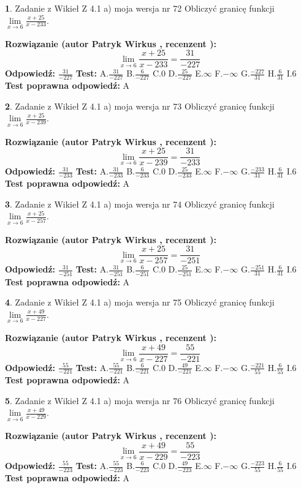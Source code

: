 \documentclass[12pt, a4paper]{article}
\theoremstyle{definition} %
\newtheorem{zad}{}
\newcommand{\zadStart}[1]{\begin{zad}#1\newline}
\newcommand{\zadStop}{\end{zad}}
\newcommand{\rozwStart}[2]{\noindent \textbf{Rozwiązanie (autor #1 , recenzent #2): }\newline}
\newcommand{\rozwStop}{\newline}
\newcommand{\odpStart}{\noindent \textbf{Odpowiedź:}\newline}
\newcommand{\odpStop}{\newline}
\newcommand{\testStart}{\noindent \textbf{Test:}\newline}
\newcommand{\testStop}{\newline}
\newcommand{\kluczStart}{\noindent \textbf{Test poprawna odpowiedź:}\newline}
\newcommand{\kluczStop}{\newline}
\begin{document}
\zadStart{Zadanie z Wikieł Z 4.1 a) moja wersja nr 72}
Obliczyć granicę funkcji $\lim\limits_{x\to6}\frac{x+25}{x-233}$.
\zadStop
\rozwStart{Patryk Wirkus}{}
$$\lim\limits_{x\to6}\frac{x+25}{x-233} = \frac{31}{-227}$$
\rozwStop
\odpStart
$\frac{31}{-227}$
\odpStop
\testStart
A.$\frac{31}{-227}$
B.$\frac{6}{-227}$
C.$0$
D.$\frac{25}{-227}$
E.$\infty$
F.$-\infty$
G.$\frac{-227}{31}$
H.$\frac{6}{31}$
I.$6$
\testStop
\kluczStart
A
\kluczStop



\zadStart{Zadanie z Wikieł Z 4.1 a) moja wersja nr 73}
Obliczyć granicę funkcji $\lim\limits_{x\to6}\frac{x+25}{x-239}$.
\zadStop
\rozwStart{Patryk Wirkus}{}
$$\lim\limits_{x\to6}\frac{x+25}{x-239} = \frac{31}{-233}$$
\rozwStop
\odpStart
$\frac{31}{-233}$
\odpStop
\testStart
A.$\frac{31}{-233}$
B.$\frac{6}{-233}$
C.$0$
D.$\frac{25}{-233}$
E.$\infty$
F.$-\infty$
G.$\frac{-233}{31}$
H.$\frac{6}{31}$
I.$6$
\testStop
\kluczStart
A
\kluczStop



\zadStart{Zadanie z Wikieł Z 4.1 a) moja wersja nr 74}
Obliczyć granicę funkcji $\lim\limits_{x\to6}\frac{x+25}{x-257}$.
\zadStop
\rozwStart{Patryk Wirkus}{}
$$\lim\limits_{x\to6}\frac{x+25}{x-257} = \frac{31}{-251}$$
\rozwStop
\odpStart
$\frac{31}{-251}$
\odpStop
\testStart
A.$\frac{31}{-251}$
B.$\frac{6}{-251}$
C.$0$
D.$\frac{25}{-251}$
E.$\infty$
F.$-\infty$
G.$\frac{-251}{31}$
H.$\frac{6}{31}$
I.$6$
\testStop
\kluczStart
A
\kluczStop



\zadStart{Zadanie z Wikieł Z 4.1 a) moja wersja nr 75}
Obliczyć granicę funkcji $\lim\limits_{x\to6}\frac{x+49}{x-227}$.
\zadStop
\rozwStart{Patryk Wirkus}{}
$$\lim\limits_{x\to6}\frac{x+49}{x-227} = \frac{55}{-221}$$
\rozwStop
\odpStart
$\frac{55}{-221}$
\odpStop
\testStart
A.$\frac{55}{-221}$
B.$\frac{6}{-221}$
C.$0$
D.$\frac{49}{-221}$
E.$\infty$
F.$-\infty$
G.$\frac{-221}{55}$
H.$\frac{6}{55}$
I.$6$
\testStop
\kluczStart
A
\kluczStop



\zadStart{Zadanie z Wikieł Z 4.1 a) moja wersja nr 76}
Obliczyć granicę funkcji $\lim\limits_{x\to6}\frac{x+49}{x-229}$.
\zadStop
\rozwStart{Patryk Wirkus}{}
$$\lim\limits_{x\to6}\frac{x+49}{x-229} = \frac{55}{-223}$$
\rozwStop
\odpStart
$\frac{55}{-223}$
\odpStop
\testStart
A.$\frac{55}{-223}$
B.$\frac{6}{-223}$
C.$0$
D.$\frac{49}{-223}$
E.$\infty$
F.$-\infty$
G.$\frac{-223}{55}$
H.$\frac{6}{55}$
I.$6$
\testStop
\kluczStart
A
\kluczStop
\end{document}
